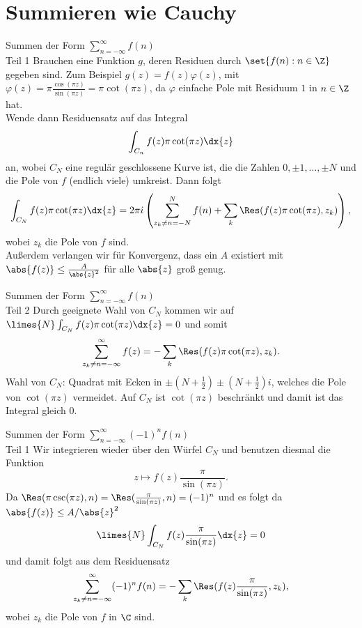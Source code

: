 \section{Summieren wie Cauchy}

\begin{karte}{Summen der Form \(\sum_{n=-\infty}^{\infty} f(n)\) \\ Teil 1}
    Brauchen eine Funktion \(g\), deren Residuen durch 
    \(\set{f(n) : n\in \Z}\) gegeben sind. Zum Beispiel 
    \(g(z) = f(z) \varphi(z)\), mit \(\varphi(z)= \pi \frac{\cos(\pi z)}{\sin(\pi z)} 
    = \pi \cot(\pi z)\), da \(\varphi\) einfache Pole mit Residuum \(1\) 
    in \(n\in \Z\) hat.\\
    Wende dann Residuensatz auf das Integral 
    \[ \int_{C_n} f(z) \pi \cot(\pi z) \dx{z} \]
    an, wobei \(C_N\) eine regulär geschlossene Kurve ist, die die Zahlen 
    \(0,\pm 1, \ldots, \pm N\) und die Pole von \(f\) (endlich viele) 
    umkreist. Dann folgt 
    \[ \int_{C_N} f(z) \pi \cot(\pi z) \dx{z} 
    = 2\pi i \left( \sum_{z_k \neq n = -N}^N f(n) + 
    \sum_k \Res(f(z) \pi \cot(\pi z), z_k) \right), \]
    wobei \(z_k\) die Pole von \(f\) sind.\\
    Außerdem verlangen wir für Konvergenz, dass ein \(A\) 
    existiert mit \(\abs{f(z)} \leq \frac{A}{\abs{z}^2}\) für alle \(\abs{z}\) groß genug.\\
\end{karte}

\begin{karte}{Summen der Form \(\sum_{n=-\infty}^{\infty} f(n)\) \\ Teil 2}
    Durch geeignete Wahl von \(C_N\) kommen wir auf \(\limes{N} \int_{C_N} f(z) \pi \cot(\pi z) \dx{z} = 0\)
    und somit 
    \[ \sum_{z_k \neq n = -\infty}^\infty f(z) = -\sum_k \Res(f(z)\pi \cot(\pi z), z_k). \]
    Wahl von \(C_N\): Quadrat mit Ecken in \(\pm(N+\frac{1}{2})\pm(N+\frac{1}{2})i\), welches 
    die Pole von \(\cot(\pi z)\) vermeidet. Auf \(C_N\) ist \(\cot(\pi z)\) beschränkt 
    und damit ist das Integral gleich \(0\).
\end{karte}

\begin{karte}{Summen der Form \(\sum_{n=-\infty}^{\infty} (-1)^n f(n)\) \\ Teil 1}
    Wir integrieren wieder über den Würfel \(C_N\) und benutzen diesmal 
    die Funktion 
    \[ z\mapsto f(z) \frac{\pi}{\sin(\pi z)}. \]
    Da \(\Res(\pi \csc(\pi z), n) = \Res(\frac{\pi}{\sin(\pi z)}, n) 
    = (-1)^n \) und es folgt da \(\abs{f(z)} \leq A/\abs{z}^2\) 
    \[ \limes{N} \int_{C_N} f(z) \frac{\pi}{\sin(\pi z)} \dx{z} = 0 \]
    und damit folgt aus dem Residuensatz 
    \[ \sum_{z_k \neq n = -\infty}^\infty (-1)^n f(n) = -\sum_k \Res(f(z) \frac{\pi}{\sin(\pi z)}, z_k), \]
    wobei \(z_k\) die Pole von \(f\) in \(\C\) sind.
\end{karte}

